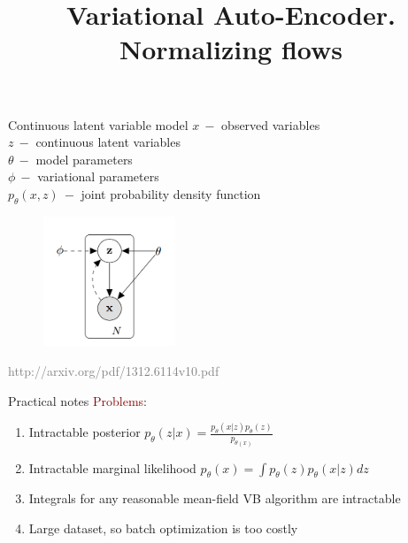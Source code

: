 \documentclass[unicode,11pt]{beamer}
\title{\large{Variational Auto-Encoder. Normalizing flows}}
\begin{document}
\begin{frame}
  \maketitle
\end{frame}

\begin{frame}[fragile]{Continuous latent variable model}
  $x~-$ observed variables\\
  $z~-$ continuous latent variables\\
  $\theta~-$ model parameters\\
  $\phi~-$ variational parameters\\
  $p_{\theta}(x, z)~-$ joint probability density function\\
	
  \begin{figure}[htbp]
    \includegraphics[height=110pt, keepaspectratio = true]{images/model}   
  \end{figure}
  \tiny \textcolor{gray} {http://arxiv.org/pdf/1312.6114v10.pdf}
\end{frame}

\begin{frame}[fragile]{Practical notes}
	\textcolor{darkred}{Problems}: 
	\begin{enumerate}
	  \item Intractable posterior $p_{\theta}(z|x) = \frac{p_{\theta}(x|z) p_{\theta}(z)}{p_{\theta(x)}}$\\
	  \item Intractable marginal likelihood $p_{\theta}(x) = \int {p_{\theta}(z) p_{\theta}(x|z) dz}$
	  \item Integrals for any reasonable mean-field VB algorithm are intractable
	  \item Large dataset, so batch optimization is too costly
  \end{enumerate}	 
	~\\
\end{frame}
\end{document}
